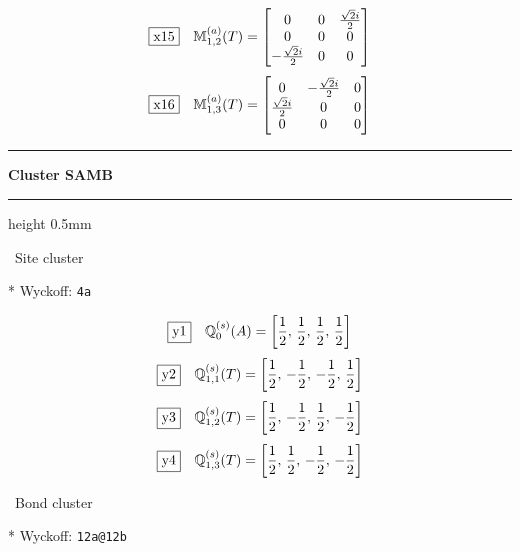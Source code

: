 \documentclass[fleqn,10pt,landscape]{jsarticle}
\begin{document}
\begin{dmath*}
\fbox{x15}\quad \mathbb{M}_{1,2}^{(a)}(T)=\begin{bmatrix} 0 & 0 & \frac{\sqrt{2} i}{2} \\ 0 & 0 & 0 \\ - \frac{\sqrt{2} i}{2} & 0 & 0 \end{bmatrix}
\end{dmath*}
\begin{dmath*}
\fbox{x16}\quad \mathbb{M}_{1,3}^{(a)}(T)=\begin{bmatrix} 0 & - \frac{\sqrt{2} i}{2} & 0 \\ \frac{\sqrt{2} i}{2} & 0 & 0 \\ 0 & 0 & 0 \end{bmatrix}
\end{dmath*}
\vspace{5mm}
\noindent \rule[0.5mm]{5mm}{0.5mm}\hspace{3mm}\textbf{Cluster SAMB}\hspace{3mm}\leaders\hrule height 0.5mm\hfill\kern0pt
\vspace{3mm}

\noindent\textbullet\, Site cluster

\vspace{5mm}

\noindent ** Wyckoff: \texttt{4a}

\begin{dmath*}
\fbox{y1}\quad \mathbb{Q}_{0}^{(s)}(A)=\left[ \frac{1}{2},\, \frac{1}{2},\, \frac{1}{2},\, \frac{1}{2} \right]
\end{dmath*}
\begin{dmath*}
\fbox{y2}\quad \mathbb{Q}_{1,1}^{(s)}(T)=\left[ \frac{1}{2},\, - \frac{1}{2},\, - \frac{1}{2},\, \frac{1}{2} \right]
\end{dmath*}
\begin{dmath*}
\fbox{y3}\quad \mathbb{Q}_{1,2}^{(s)}(T)=\left[ \frac{1}{2},\, - \frac{1}{2},\, \frac{1}{2},\, - \frac{1}{2} \right]
\end{dmath*}
\begin{dmath*}
\fbox{y4}\quad \mathbb{Q}_{1,3}^{(s)}(T)=\left[ \frac{1}{2},\, \frac{1}{2},\, - \frac{1}{2},\, - \frac{1}{2} \right]
\end{dmath*}
\vspace{5mm}

\noindent\textbullet\, Bond cluster

\vspace{5mm}

\noindent ** Wyckoff: \texttt{12a@12b}
\end{document}
